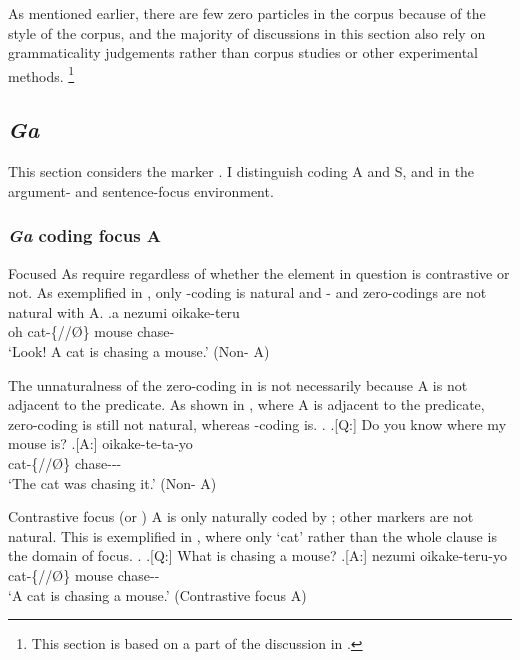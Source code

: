 As mentioned earlier,
there are few zero particles in the corpus because of the style of the corpus, and the majority of discussions in this section also rely on grammaticality judgements rather than corpus studies or other experimental methods.%
 \footnote{
 This section is based on a part of the discussion in .
 }

\subsection{\textit{Ga}}\label{Par:CasePar:Ga}

This section considers the marker .
I distinguish  coding A and S, and  in the argument- and sentence-focus environment.

\subsubsection{\textit{Ga} coding focus A}

Focused As require  regardless of
whether the element in question is contrastive or not.
As exemplified in \Next,
only -coding is natural and - and zero-codings are not natural with  A.
%
\exg.\label{ExfocusA}a  nezumi oikake-teru \\
	oh cat-\{//{\O}\} mouse chase- \\
	`Look! A cat is chasing a mouse.' \hfill{(Non- A)}

The unnaturalness of the zero-coding in \Last is not necessarily because A is not adjacent to the predicate.
As shown in \Next, where A is adjacent to the predicate,
zero-coding is still not natural, whereas  -coding is.
%
\ex. \a.[Q:] Do you know where my mouse is?
	\bg.[A:]  oikake-te-ta-yo \\
		cat-\{//{\O}\} chase--- \\
		`The cat was chasing it.' \hfill{(Non- A)}

Contrastive focus (or ) A is only naturally coded by ; other markers are not natural.
This is exemplified in \Next,
where only  `cat' rather than the whole clause is the domain of focus.
%
\ex.
	\a.[Q:] What is chasing a mouse?
	\bg.[A:]  nezumi oikake-teru-yo \\
	cat-\{//{\O}\} mouse chase-- \\
	`A cat is chasing a mouse.' \hfill{(Contrastive focus A)}


